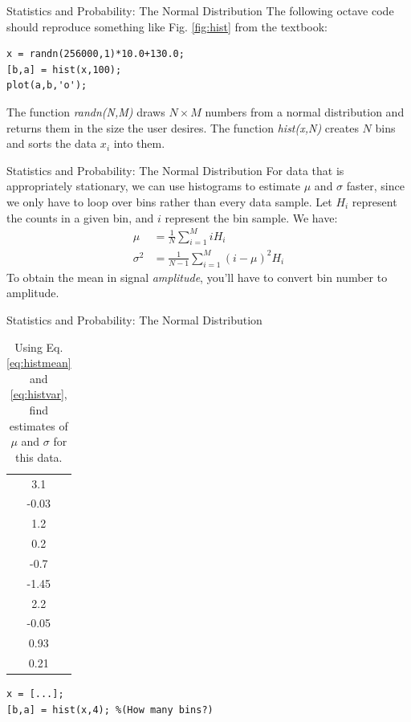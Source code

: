 \documentclass{beamer}
\begin{document}
\begin{frame}[fragile]{Statistics and Probability: The Normal Distribution}
The following octave code should reproduce something like Fig. \ref{fig:hist} from the textbook:
\begin{verbatim}
x = randn(256000,1)*10.0+130.0;
[b,a] = hist(x,100);
plot(a,b,'o');
\end{verbatim}
The function \textit{randn(N,M)} draws $N \times M$ numbers from a normal distribution and returns them in the size the user desires.  The function \textit{hist(x,N)} creates $N$ bins and sorts the data $x_i$ into them.
\end{frame}

\begin{frame}[fragile]{Statistics and Probability: The Normal Distribution}
\small
For data that is appropriately stationary, we can use histograms to estimate $\mu$ and $\sigma$ faster, since we only have to loop over bins rather than every data sample.  Let $H_i$ represent the counts in a given bin, and $i$ represent the bin sample.  We have:
\begin{align}
\mu &= \frac{1}{N}\sum_{i=1}^{M}i H_i \label{eq:histmean} \\
\sigma^{2} &= \frac{1}{N-1}\sum_{i=1}^M \left(i-\mu\right)^2 H_i \label{eq:histvar}
\end{align}
To obtain the mean in signal \textit{amplitude}, you'll have to convert bin number to amplitude.
\end{frame}

\begin{frame}[fragile]{Statistics and Probability: The Normal Distribution}
\small
\begin{table}
\begin{tabular}{c}
3.1 \\
-0.03 \\
1.2 \\
0.2 \\
-0.7 \\
-1.45 \\
2.2 \\
-0.05 \\
0.93 \\
0.21 
\end{tabular}
\caption{\label{tab:hist} Using Eq. \ref{eq:histmean} and \ref{eq:histvar}, find estimates of $\mu$ and $\sigma$ for this data.}
\end{table}
\begin{verbatim}
x = [...];
[b,a] = hist(x,4); %(How many bins?)
\end{verbatim}
\end{frame}
\end{document}

